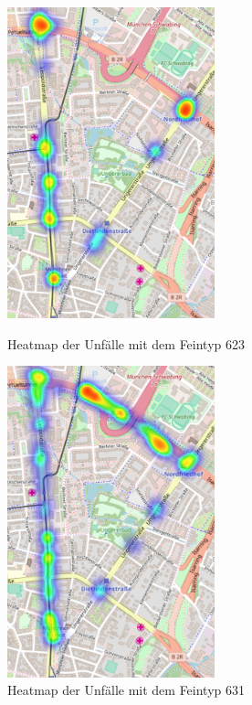 \begin{figure}[htb]
	\centering
	\begin{minipage}[t]{0.45\linewidth}
		\centering
		\includegraphics[width=6cm,height=9cm]{figures/HM_623}
		\caption{Heatmap der Unfälle mit dem Feintyp 623}\label{fig:Heatmap_623}
	\end{minipage}%
	\hfill
	\begin{minipage}[t]{0.45\linewidth}
		\centering
		\includegraphics[width=6cm,height=9cm]{figures/HM_631}
		\caption{Heatmap der Unfälle mit dem Feintyp 631}\label{fig:Heatmap_631}
	\end{minipage}
\end{figure}

